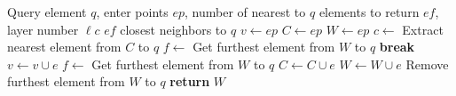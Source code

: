 \begin{algorithm}[H]
\caption{SEARCH-LAYER($q$, $ep$, $ef$, $\ell{c}$)}\label{alg:search_layer}
\begin{algorithmic}[1]
\Require Query element $q$, enter points $ep$, number of nearest to $q$ elements to return $ef$, layer number $\ell{c}$
\Ensure $ef$ closest neighbors to $q$
\State $v \gets ep$ 
\State $C \gets ep$ 
\State $W \gets ep$ 
    \State $c \gets$ Extract nearest element from $C$ to $q$
    \State $f \gets$ Get furthest element from $W$ to $q$
        \State \textbf{break} 
    \EndIf
     
            \State $v \gets v \cup e$
            \State $f \gets$ Get furthest element from $W$ to $q$
                \State $C \gets C \cup e$
                \State $W \gets W \cup e$
                    \State Remove furthest element from $W$ to $q$
                \EndIf
            \EndIf
        \EndIf
    \EndFor
\EndWhile
\State \textbf{return} $W$
\end{algorithmic}
\end{algorithm}